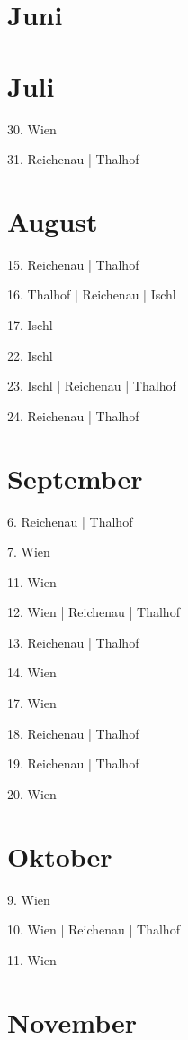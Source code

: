 \documentclass[twoside=false,titlepage=false,open=any, parskip=never, fontsize=10pt, headings=small, chapterprefix=false, appendixprefix=false, DIV=15]{scrbook}
\begin{document}
\begin{multicols}{3}
            \section*{Juni}
            \section*{Juli}
            30. Wien\par
            31. Reichenau | Thalhof\par
            \section*{August}
            15. Reichenau | Thalhof\par
            16. Thalhof | Reichenau | Ischl\par
            17. Ischl\par
            22. Ischl\par
            23. Ischl | Reichenau | Thalhof\par
            24. Reichenau | Thalhof\par
            \section*{September}
            6. Reichenau | Thalhof\par
            7. Wien\par
            11. Wien\par
            12. Wien | Reichenau | Thalhof\par
            13. Reichenau | Thalhof\par
            14. Wien\par
            17. Wien\par
            18. Reichenau | Thalhof\par
            19. Reichenau | Thalhof\par
            20. Wien\par
            \section*{Oktober}
            9. Wien\par
            10. Wien | Reichenau | Thalhof\par
            11. Wien\par
            \section*{November}

\end{multicols}
\end{document}
